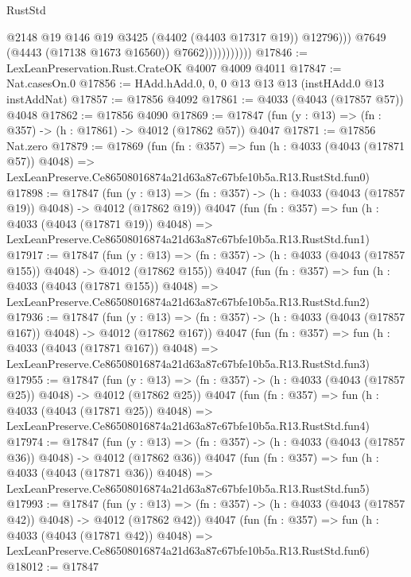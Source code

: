 \begin{lexlean}{RustStd}
\begin{coremodule}
                                @2148
                                @19
                                @146
                                @19
                                @3425
                                (@4402 (@4403 @17317 @19))
                                @12796)))
                          @7649
                          (@4443 (@17138 @1673 @16560))
                          @7662)))))))))))
@17846 := LexLeanPreservation.Rust.CrateOK @4007 @4009 @4011
@17847 := Nat.casesOn.{0}
@17856 := HAdd.hAdd.{0, 0, 0} @13 @13 @13 (instHAdd.{0} @13 instAddNat)
@17857 := @17856 @4092
@17861 := @4033 (@4043 (@17857 @57)) @4048
@17862 := @17856 @4090
@17869 := @17847 (fun (y : @13) => (fn : @357) -> (h : @17861) -> @4012 (@17862 @57)) @4047
@17871 := @17856 Nat.zero
@17879 := @17869
    (fun (fn : @357) =>
    fun (h : @4033 (@4043 (@17871 @57)) @4048) =>
    LexLeanPreserve.Ce86508016874a21d63a87c67bfe10b5a.R13.RustStd.fun0)
@17898 := @17847
    (fun (y : @13) => (fn : @357) -> (h : @4033 (@4043 (@17857 @19)) @4048) -> @4012 (@17862 @19))
    @4047
    (fun (fn : @357) =>
    fun (h : @4033 (@4043 (@17871 @19)) @4048) =>
    LexLeanPreserve.Ce86508016874a21d63a87c67bfe10b5a.R13.RustStd.fun1)
@17917 := @17847
    (fun (y : @13) => (fn : @357) -> (h : @4033 (@4043 (@17857 @155)) @4048) -> @4012 (@17862 @155))
    @4047
    (fun (fn : @357) =>
    fun (h : @4033 (@4043 (@17871 @155)) @4048) =>
    LexLeanPreserve.Ce86508016874a21d63a87c67bfe10b5a.R13.RustStd.fun2)
@17936 := @17847
    (fun (y : @13) => (fn : @357) -> (h : @4033 (@4043 (@17857 @167)) @4048) -> @4012 (@17862 @167))
    @4047
    (fun (fn : @357) =>
    fun (h : @4033 (@4043 (@17871 @167)) @4048) =>
    LexLeanPreserve.Ce86508016874a21d63a87c67bfe10b5a.R13.RustStd.fun3)
@17955 := @17847
    (fun (y : @13) => (fn : @357) -> (h : @4033 (@4043 (@17857 @25)) @4048) -> @4012 (@17862 @25))
    @4047
    (fun (fn : @357) =>
    fun (h : @4033 (@4043 (@17871 @25)) @4048) =>
    LexLeanPreserve.Ce86508016874a21d63a87c67bfe10b5a.R13.RustStd.fun4)
@17974 := @17847
    (fun (y : @13) => (fn : @357) -> (h : @4033 (@4043 (@17857 @36)) @4048) -> @4012 (@17862 @36))
    @4047
    (fun (fn : @357) =>
    fun (h : @4033 (@4043 (@17871 @36)) @4048) =>
    LexLeanPreserve.Ce86508016874a21d63a87c67bfe10b5a.R13.RustStd.fun5)
@17993 := @17847
    (fun (y : @13) => (fn : @357) -> (h : @4033 (@4043 (@17857 @42)) @4048) -> @4012 (@17862 @42))
    @4047
    (fun (fn : @357) =>
    fun (h : @4033 (@4043 (@17871 @42)) @4048) =>
    LexLeanPreserve.Ce86508016874a21d63a87c67bfe10b5a.R13.RustStd.fun6)
@18012 := @17847

\end{coremodule}
\end{lexlean}

